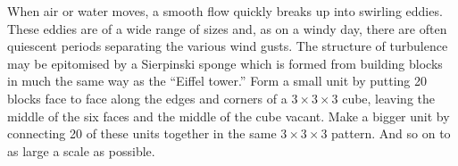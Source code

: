 When air or water moves, a smooth flow quickly breaks up into 
swirling eddies.  These eddies are of a wide range of sizes and, as 
on a windy day, there are often quiescent periods separating the 
various wind gusts.  The structure of turbulence may be epitomised by 
a Sierpinski sponge which is formed from building blocks in much the 
same way as the ``Eiffel tower.''  Form a small unit by putting 20 
blocks face to face along the edges and corners of a $3\times 
3\times 3$ cube, 
leaving the middle of the six faces and the middle of the cube 
vacant.  Make a bigger unit by connecting 20 of these units together 
in the same 
\(
	3\times 3\times 3
\)
 pattern.  And so on to as large a scale as possible.
 
 

